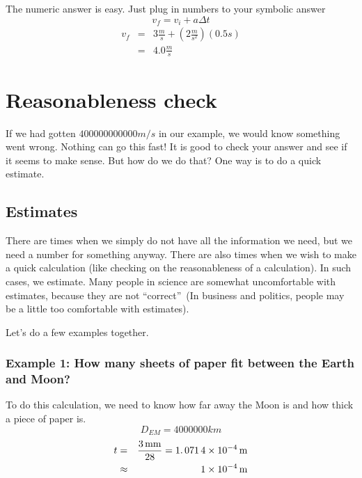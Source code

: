 \documentclass[]{Book}
\begin{document}
The numeric answer is easy. Just plug in numbers to your symbolic answer%
\begin{equation*}
	v_{f}=v_{i}+a\Delta t
\end{equation*}%
\begin{eqnarray*}
	v_{f} &=&3\frac{\unit{m}}{\unit{s}}+\left( 2\frac{\unit{m}}{\unit{s}^{2}}%
	\right) \left( 0.5\unit{s}\right) \\
	&=&4.0\frac{\unit{m}}{\unit{s}}
\end{eqnarray*}

\section{Reasonableness check}

If we had gotten $400000000000\unit{m}/\unit{s}$ in our example, we would
know something went wrong. Nothing can go this fast! It is good to check
your answer and see if it seems to make sense. But how do we do that? One
way is to do a quick estimate.

\subsection{Estimates}



There are times when we simply do not have all the information we need, but
we need a number for something anyway. There are also times when we wish to
make a quick calculation (like checking on the reasonableness of a
calculation). In such cases, we estimate. Many people in science are
somewhat uncomfortable with estimates, because they are not
\textquotedblleft correct\textquotedblright\ (In business and politics,
people may be a little too comfortable with estimates).

Let's do a few examples together.

\subsubsection{Example 1: How many sheets of paper fit between the Earth and
	Moon?}

To do this calculation, we need to know how far away the Moon is and how
thick a piece of paper is.%
\begin{equation}
	D_{EM}=4000000\unit{km}
\end{equation}%
\begin{eqnarray}
	t &=&\frac{3\mathord{\thinspace\rm mm}}{28}=1.\,\allowbreak 071\,4\times 10^{-4}\mathord{\thinspace\rm m} \\
	&\approx &\allowbreak 1\times 10^{-4}\mathord{\thinspace\rm m}  \notag
\end{eqnarray}
\end{document}

